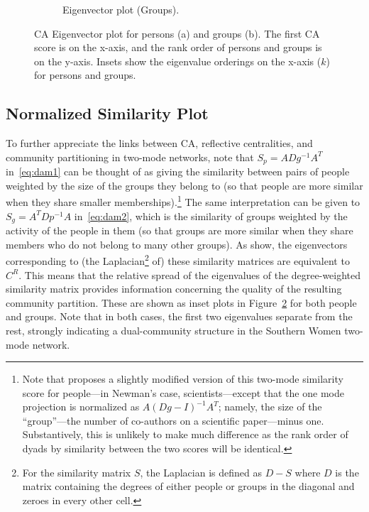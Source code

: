 \documentclass[a4paper,fleqn]{cas-sc}
\begin{document}
\begin{figure}
\begin{subfigure}[b]{0.45\textwidth}
            \caption{Eigenvector plot (Groups).}
            \label{fig:bon-reord}
    \end{subfigure}
    \caption{CA Eigenvector plot for persons (a) and groups (b). The first CA score is on the x-axis, and the rank order of persons and groups is on the y-axis. Insets show the eigenvalue orderings on the x-axis ($k$) for persons and groups.}
    \label{fig:ca-eigvec}
\end{figure}

\subsection{Normalized Similarity Plot} \label{subsec:normsim}
To further appreciate the links between CA, reflective centralities, and community partitioning in two-mode networks, note that $S_p = ADg^{-1}A^T$ in~\ref{eq:dam1} can be thought of as giving the similarity between pairs of people weighted by the size of the groups they belong to (so that people are more similar when they share smaller memberships).\footnote{Note that \citet[eq.2]{newman2001scientific} proposes a slightly modified version of this two-mode similarity score for people---in Newman's case, scientists---except that the one mode projection is normalized as $A(Dg - I)^{-1}A^T$; namely, the size of the ``group''---the number of co-authors on a scientific paper---minus one. Substantively, this is unlikely to make much difference as the rank order of dyads by similarity between the two scores will be identical.} The same interpretation can be given to $S_g = A^TDp^{-1}A$ in~\ref{eq:dam2}, which is the similarity of groups weighted by the activity of the people in them (so that groups are more similar when they share members who do not belong to many other groups). As \citet{van2021correspondence} show, the eigenvectors corresponding to (the Laplacian\footnote{For the similarity matrix $S$, the Laplacian is defined as $D-S$ where $D$ is the matrix containing the degrees of either people or groups in the diagonal and zeroes in every other cell.} of) these similarity matrices are equivalent to $C^R$. This means that the relative spread of the eigenvalues of the degree-weighted similarity matrix provides information concerning the quality of the resulting community partition. These are shown as inset plots in Figure~\ref{fig:ca-eigvec} for both people and groups. Note that in both cases, the first two eigenvalues separate from the rest, strongly indicating a dual-community structure in the Southern Women two-mode network. 
\end{document}
